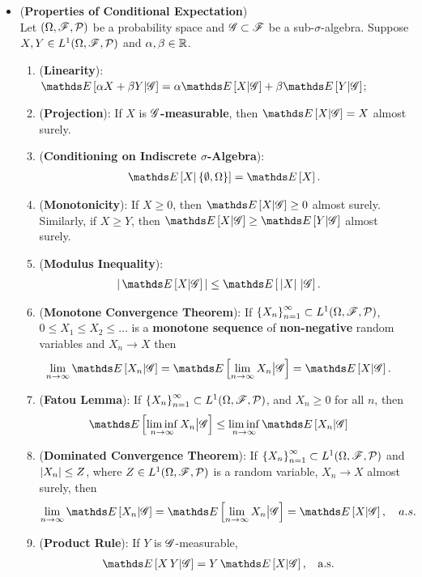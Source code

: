 \documentclass[11pt]{article}
\begin{document}
\begin{itemize}
\item \begin{proposition} (\textbf{Properties of Conditional Expectation}) \citep{resnick2013probability}\\
Let $(\Omega, {\mathscr F}, {\mathcal P})$ be a probability space and ${\mathscr G} \subset {\mathscr F}$ be a sub-$\sigma$-algebra. Suppose $X, Y \in  L^{1}(\Omega, {\mathscr F}, {\mathcal P})$ and $\alpha, \beta \in {\mathbb R}$.
\begin{enumerate}
\item (\textbf{Linearity}): $\E{}{\alpha X+ \beta Y | \srG} = \alpha \E{}{X| \srG} +\beta  \E{}{Y | \srG}$;
\item (\textbf{Projection}): If $X$ is \textbf{${\mathscr G}$-measurable}, then $\E{}{X | \srG} = X$ almost surely.
\item (\textbf{Conditioning on Indiscrete $\sigma$-Algebra}): 
\begin{align*}
\E{}{X | \set{\emptyset, \Omega}} = \E{}{X}.
\end{align*}
\item (\textbf{Monotonicity}):  If $X \ge 0$, then $\E{}{X | \srG} \ge 0$ almost surely. Similarly, if $X \ge Y$, then $\E{}{X | \srG} \ge \E{}{Y | \srG}$  almost surely.
\item (\textbf{Modulus Inequality}): 
\begin{align*}
\abs{\,\E{}{X | \srG}\,} &\le \E{}{\,\abs{X} \, | \srG}.
\end{align*}
\item (\textbf{Monotone Convergence Theorem}): If  $\left\{X_n\right\}_{n=1}^{\infty} \subset  L^{1}(\Omega, {\mathscr F}, {\mathcal P})$,  $0 \le X_1 \le X_{2}\le \ldots$ is a \textbf{monotone sequence} of \textbf{non-negative} random variables and $X_n \rightarrow X$ then
\begin{align*}
\lim\limits_{n\rightarrow \infty}\E{}{X_n | \srG} &= \E{}{\lim\limits_{n\rightarrow \infty} X_n \big| \srG} = \E{}{X | \srG}.
\end{align*}
\item (\textbf{Fatou Lemma}): If  $\left\{X_n\right\}_{n=1}^{\infty} \subset  L^{1}(\Omega, {\mathscr F}, {\mathcal P})$, and $X_n \ge 0$ for all $n$, then
\begin{align*}
\E{}{\liminf\limits_{n\rightarrow \infty} X_n \big| \srG} &\le \liminf\limits_{n\rightarrow \infty} \E{}{X_n | \srG} 
\end{align*} 
\item  (\textbf{Dominated Convergence Theorem}):  If  $\left\{X_n\right\}_{n=1}^{\infty} \subset  L^{1}(\Omega, {\mathscr F}, {\mathcal P})$ and $\left\lvert X_n \right\rvert \le Z$, where $Z \in L^{1}(\Omega, {\mathscr F}, {\mathcal P})$ is a random variable, $X_n \rightarrow X$ almost surely,  then
\begin{align*}
\lim\limits_{n\rightarrow \infty}\E{}{X_n | \srG} &= \E{}{\lim\limits_{n\rightarrow \infty} X_n \big| \srG} = \E{}{X | \srG}, \quad a.s.
\end{align*}
\item (\textbf{Product Rule}): If $Y$ is ${\mathscr G}$-measurable, 
\begin{align*}
\E{}{X\,Y | \srG} &= Y\,\E{}{X | \srG},\;\; \text{ a.s.}
\end{align*}



\end{enumerate}
\end{proposition}
\end{itemize}
\end{document}
